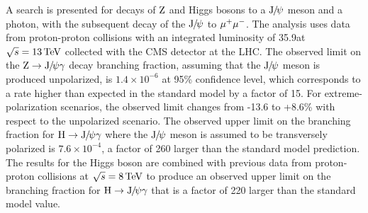 % 
% 
%
A search is presented for decays of $\mathrm{Z}$ and Higgs bosons to a ${\mathrm{J}\hspace{-.08em}/\hspace{-.14em}\psi}$ meson and a photon, with the subsequent decay of the ${\mathrm{J}\hspace{-.08em}/\hspace{-.14em}\psi}$ to $\mu^{+}\mu^{-}$. The analysis uses data from proton-proton collisions with an integrated luminosity of 35.9\fbinv at $\sqrt{s}=13\,\text{Te\hspace{-.08em}V}$ collected with the CMS detector at the LHC. The observed limit on the $\mathrm{Z}\to{\mathrm{J}\hspace{-.08em}/\hspace{-.14em}\psi}\gamma$ decay branching fraction, assuming that the ${\mathrm{J}\hspace{-.08em}/\hspace{-.14em}\psi}$ meson is produced unpolarized, is $1.4\times10^{-6}$ at 95\% confidence level, which corresponds to a rate higher than expected in the standard model by a factor of 15. For extreme-polarization scenarios, the observed limit changes from -13.6 to +8.6\% with respect to the unpolarized scenario. The observed upper limit on the branching fraction for $\mathrm{H}\to{\mathrm{J}\hspace{-.08em}/\hspace{-.14em}\psi}\gamma$ where the ${\mathrm{J}\hspace{-.08em}/\hspace{-.14em}\psi}$ meson is assumed to be transversely polarized is $7.6\times 10^{-4}$, a factor of 260 larger than the standard model prediction. The results for the Higgs boson are combined with previous data from proton-proton collisions at $\sqrt{s}=8\,\text{Te\hspace{-.08em}V}$ to produce an observed upper limit on the branching fraction for $\mathrm{H}\to{\mathrm{J}\hspace{-.08em}/\hspace{-.14em}\psi}\gamma$ that is a factor of 220 larger than the standard model value.